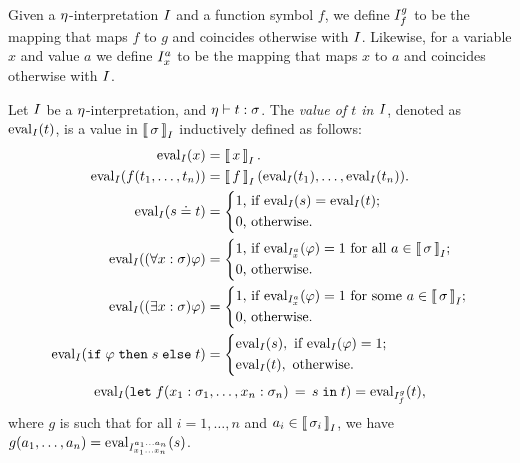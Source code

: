 Given a $\context$-interpretation $\intI$ and a function symbol $f$, we define $\variant{\intI}{f}{g}$ to be the mapping that maps $f$ to $g$ and coincides otherwise with $\intI$.
Likewise, for a variable $x$ and value $a$ we define $\variant{\intI}{x}{a}$ to be the mapping that maps $x$ to $a$ and coincides otherwise with $\intI$.

\begin{definition}\label{def:folb-term-evaluation}\rm
  Let $\intI$ be a $\context$-interpretation, and $\context \vdash t:\sigma$. The \emph{value of $t$ in $\intI$}, denoted as $\eval{t}{\intI}$, is a value in $\interpret{\sigma}{\intI}$ inductively defined as follows:
  \[
    \begin{aligned}
      \eval{x}{\intI} &= \interpret{x}{\intI}.
      \\
      \eval{f(t_1, \ldots, t_n)}{\intI} &= \interpret{f}{\intI}(\eval{t_1}{\intI}, \ldots, \eval{t_n}{\intI}).
      \\
      \eval{s \eql t}{\intI} &=
        \left\{ \begin{aligned}
                  &\text{1, if $\eval{s}{\intI} = \eval{t}{\intI}$;} \\
                  &\text{0, otherwise.}
                \end{aligned}\right.
      \\
      \eval{(\forall x : \sigma)\phi}{\intI} &=
        \left\{ \begin{aligned}
                  &\text{1, if $\eval{\phi}{\replacement{\intI}{x}{a}} = 1$ for all $a \in \interpret{\sigma}{\intI}$;} \\
                  &\text{0, otherwise.}
                \end{aligned}\right.
      \\
      \eval{(\exists x : \sigma)\phi}{\intI} &=
        \left\{ \begin{aligned}
                  &\text{1, if $\eval{\phi}{\replacement{\intI}{x}{a}} = 1$ for some  $a \in \interpret{\sigma}{\intI}$;} \\
                  &\text{0, otherwise.}
                \end{aligned}\right.
      \\
      \eval{\ite{\phi}{s}{t}}{\intI} &=
        \left\{ \begin{aligned}
                  &\eval{s}{\intI},\text{ if $\eval{\phi}{\intI} = 1$;} \\
                  &\eval{t}{\intI},\text{ otherwise.}
                \end{aligned}\right.
    \end{aligned}
  \]
  \[
      \eval{\letin{f(x_1:\sigma_1,\ldots,x_n:\sigma_n)}{s}{t}}{\intI} = \eval{t}{\replacement{\intI}{f}{g}},
  \]
  where $g$ is such that for all $i = 1, \ldots, n$ and $a_i \in \interpret{\sigma_i}{\intI}$, we have $g(a_1, \ldots, a_n) = \eval{s}{\replacement{\intI}{x_1 \ldots x_n}{a_1 \ldots a_n}}$. \QED
\end{definition}

